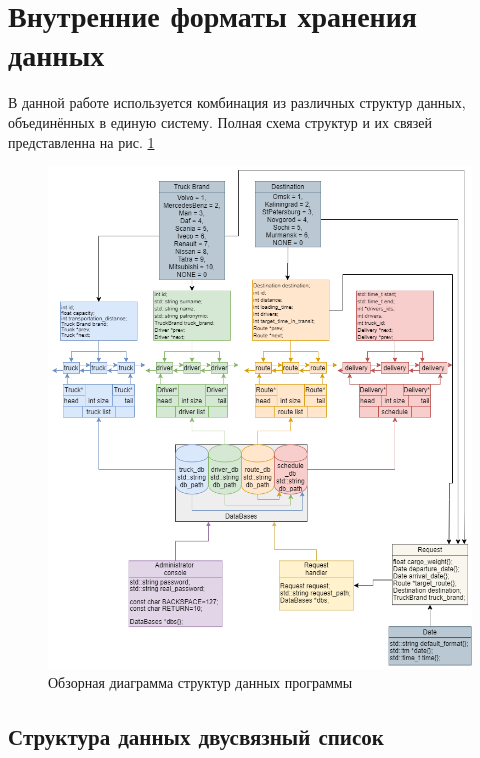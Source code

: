 \section{Внутренние форматы хранения данных}
\setcounter{figure}{0}


В данной работе используется комбинация из различных структур данных, 
объединённых в единую систему.
Полная схема структур и их связей представленна на рис. \ref{overall_data_structure}

\begin{figure}[hpt!]
    \centering
    \includegraphics[width=1\linewidth]{photo/overall_data_structure}
    \caption{Обзорная диаграмма структур данных программы}
    \label{overall_data_structure}
\end{figure}

\newpage

\subsection{Структура данных двусвязный список}

